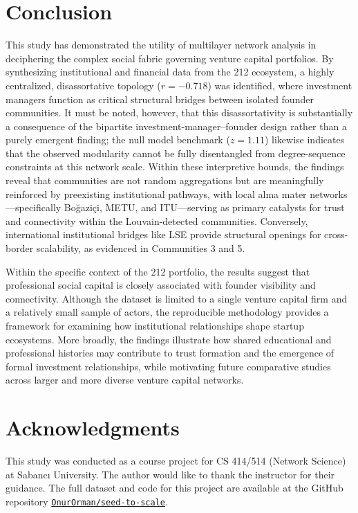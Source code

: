 \documentclass[conference]{IEEEtran}
\begin{document}
\section{Conclusion}

This study has demonstrated the utility of multilayer network analysis in deciphering the complex social fabric governing venture capital portfolios. By synthesizing institutional and financial data from the 212 ecosystem, a highly centralized, disassortative topology ($r = -0.718$) was identified, where investment managers function as critical structural bridges between isolated founder communities. It must be noted, however, that this disassortativity is substantially a consequence of the bipartite investment-manager–founder design rather than a purely emergent finding; the null model benchmark ($z = 1.11$) likewise indicates that the observed modularity cannot be fully disentangled from degree-sequence constraints at this network scale. Within these interpretive bounds, the findings reveal that communities are not random aggregations but are meaningfully reinforced by preexisting institutional pathways, with local alma mater networks—specifically Boğaziçi, METU, and ITU—serving as primary catalysts for trust and connectivity within the Louvain-detected communities. Conversely, international institutional bridges like LSE provide structural openings for cross-border scalability, as evidenced in Communities 3 and 5.

Within the specific context of the 212 portfolio, the results suggest that professional social capital is closely associated with founder visibility and connectivity. Although the dataset is limited to a single venture capital firm and a relatively small sample of actors, the reproducible methodology provides a framework for examining how institutional relationships shape startup ecosystems. More broadly, the findings illustrate how shared educational and professional histories may contribute to trust formation and the emergence of formal investment relationships, while motivating future comparative studies across larger and more diverse venture capital networks.

\section*{Acknowledgments}
This study was conducted as a course project for CS 414/514 (Network Science) at Sabancı University. The author would like to thank the instructor for their guidance. The full dataset and code for this project are available at the GitHub repository \texttt{\href{https://github.com/OnurOrman/seed-to-scale}{OnurOrman/seed-to-scale}}.
\end{document}
